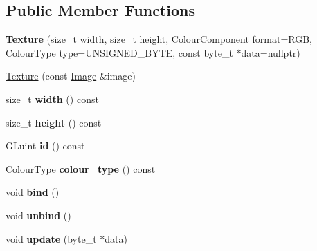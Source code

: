 \subsection*{\-Public \-Member \-Functions}
\begin{DoxyCompactItemize}
\item 
\hypertarget{classs9_1_1gl_1_1Texture_a3526c1107953f08fc08902323ecf729a}{{\bfseries \-Texture} (size\-\_\-t width, size\-\_\-t height, \-Colour\-Component format=\-R\-G\-B, \-Colour\-Type type=\-U\-N\-S\-I\-G\-N\-E\-D\-\_\-\-B\-Y\-T\-E, const byte\-\_\-t $\ast$data=nullptr)}\label{classs9_1_1gl_1_1Texture_a3526c1107953f08fc08902323ecf729a}

\item 
\hyperlink{classs9_1_1gl_1_1Texture_a169bf6c0f7958eee33cf1d60ba0c7806}{\-Texture} (const \hyperlink{classs9_1_1Image}{\-Image} \&image)
\item 
\hypertarget{classs9_1_1gl_1_1Texture_ab82700fa4e4736c1fb77126e38b433ec}{size\-\_\-t {\bfseries width} () const }\label{classs9_1_1gl_1_1Texture_ab82700fa4e4736c1fb77126e38b433ec}

\item 
\hypertarget{classs9_1_1gl_1_1Texture_af4f31ed39114c6e483a2d02daadf30b1}{size\-\_\-t {\bfseries height} () const }\label{classs9_1_1gl_1_1Texture_af4f31ed39114c6e483a2d02daadf30b1}

\item 
\hypertarget{classs9_1_1gl_1_1Texture_a739f6f9b66d3b17976040eddc5106f2e}{\-G\-Luint {\bfseries id} () const }\label{classs9_1_1gl_1_1Texture_a739f6f9b66d3b17976040eddc5106f2e}

\item 
\hypertarget{classs9_1_1gl_1_1Texture_a17a79554dbc6901d0e3ea0fed53c951a}{\-Colour\-Type {\bfseries colour\-\_\-type} () const }\label{classs9_1_1gl_1_1Texture_a17a79554dbc6901d0e3ea0fed53c951a}

\item 
\hypertarget{classs9_1_1gl_1_1Texture_a3840dc7429982ffaddeafc8d62345b5d}{void {\bfseries bind} ()}\label{classs9_1_1gl_1_1Texture_a3840dc7429982ffaddeafc8d62345b5d}

\item 
\hypertarget{classs9_1_1gl_1_1Texture_a8480eed7ed703a937c3e6ab528f559bd}{void {\bfseries unbind} ()}\label{classs9_1_1gl_1_1Texture_a8480eed7ed703a937c3e6ab528f559bd}

\item 
\hypertarget{classs9_1_1gl_1_1Texture_aba2a44f5f3ebfff88cfe73d5eddf499d}{void {\bfseries update} (byte\-\_\-t $\ast$data)}\label{classs9_1_1gl_1_1Texture_aba2a44f5f3ebfff88cfe73d5eddf499d}

\end{DoxyCompactItemize}
